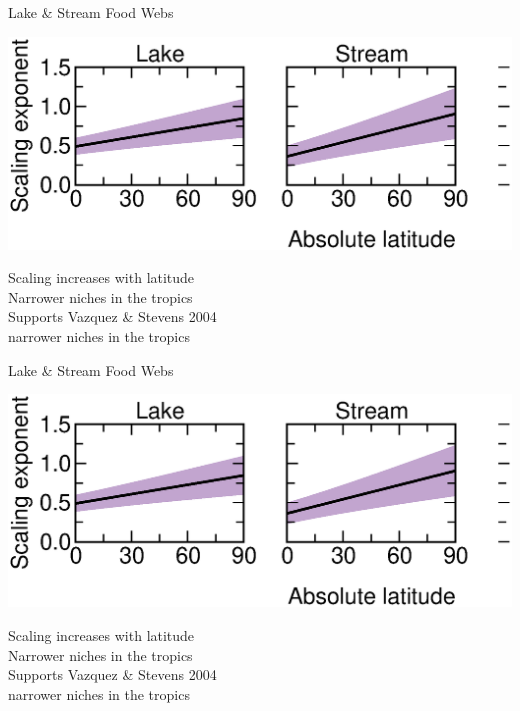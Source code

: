 \documentclass{beamer}
\begin{document}
  \begin{frame}{Lake \& Stream Food Webs}
    \begin{center}
      \includegraphics*[width=.75\textwidth]{Figures/results/effect.eps}

      \vspace{1cm}
      Scaling increases with latitude\\
      {\color{white} Narrower niches in the tropics\\
      \vspace{.54cm}      
      Supports Vazquez \& Stevens 2004\\}
      {\color{white} narrower niches in the tropics}

    \end{center}
  \end{frame}


  \begin{frame}{Lake \& Stream Food Webs}
    \begin{center}
      \includegraphics*[width=.75\textwidth]{Figures/results/effect.eps}

      \vspace{1cm}
      Scaling increases with latitude\\
      Narrower niches in the tropics\\
      \vspace{.54cm}     
      {\color{white} Supports Vazquez \& Stevens 2004\\}
      {\color{white} narrower niches in the tropics}

    \end{center}
  \end{frame}
\end{document}

